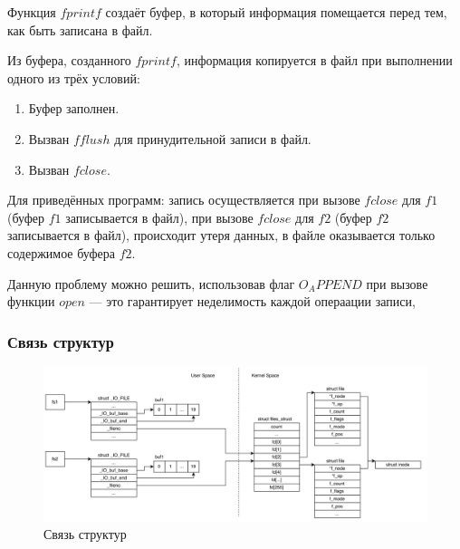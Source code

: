 Функция $fprintf$ создаёт буфер, в который информация помещается перед тем, как быть записана в файл.

Из буфера, созданного $fprintf$, информация копируется в файл при выполнении одного из трёх условий:

\begin{enumerate}
	\item Буфер заполнен.
	\item Вызван $fflush$ для принудительной записи в файл.
	\item Вызван $fclose$.
\end{enumerate}

Для приведённых программ: запись осуществляется при вызове $fclose$ для $f1$ (буфер $f1$ записывается в файл), при вызове $fclose$ для $f2$ (буфер $f2$ записывается в файл), происходит утеря данных, в файле оказывается только содержимое буфера $f2$.

Данную проблему можно решить, использовав флаг $O_APPEND$ при вызове функции $open$ --- это гарантирует неделимость каждой операации записи,

\clearpage
\subsubsection*{Связь структур}

\begin{figure}[h]
	\centering
	\captionsetup{justification=centering}
	\includegraphics[width=160mm]{img/prog3_diagram.png}
	\caption{Связь структур}
	\label{fig:prog-3-diagram}
\end{figure}



